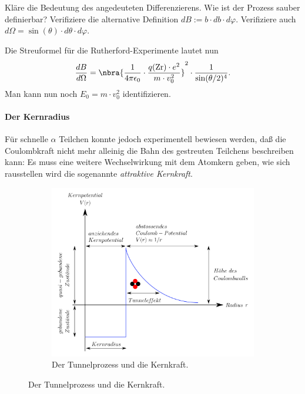 \documentclass{subfiles}
\begin{document}
    \begin{Aufgabe}
        \nr{} Kläre die Bedeutung des angedeuteten Differenzierens. Wie ist der Prozess sauber definierbar?
        \nr{} Verifiziere die alternative Definition $dB:=b\cdot db\cdot d\varphi$. Verifiziere auch $d\Omega=\sin(\theta) \cdot d\theta\cdot d\varphi$. 
    \end{Aufgabe}

    Die Streuformel für die Rutherford-Experimente lautet nun
    \[\frac{dB}{d\Omega} = \nbra{\frac{1}{4\pi\epsilon_0}\cdot\frac{q(\text{Zr})\cdot e^2}{m\cdot v_0^2}}^2 \cdot \frac{1}{\sin(\theta/2)^4}.\]
    Man kann nun noch $E_0=m\cdot v_0^2$ identifizieren. 

    \paragraph*{Der Kernradius}
        Für schnelle $\alpha$ Teilchen konnte jedoch experimentell bewiesen werden, daß die Coulombkraft nicht mehr alleinig die Bahn des gestreuten Teilchens beschreiben kann: Es muss eine weitere Wechselwirkung mit dem Atomkern geben, wie sich rausstellen wird die sogenannte \emph{attraktive Kernkraft}.
        \begin{figure}
            \centering
            \begin{subfigure}[b]{0.4\textwidth}
                \centering
                \includegraphics[options]{Bilddateien/1200px-Tunneleffekt_alpha_zerfall.svg.png}
                \caption{Der Tunnelprozess und die Kernkraft.}
            \end{subfigure}
        \end{figure}
        
\end{document}
